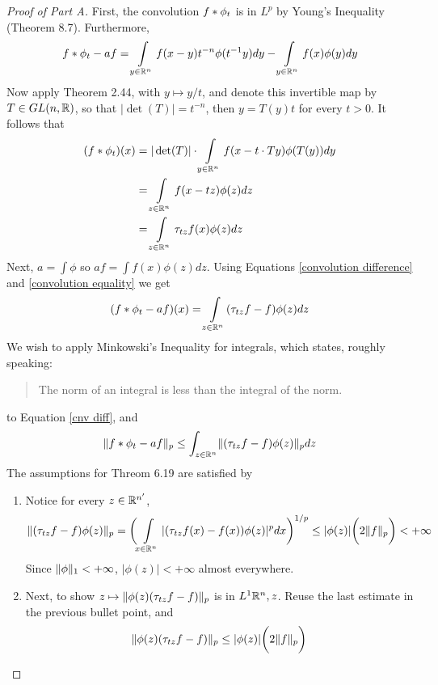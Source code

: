 \documentclass[../../main.tex]{subfiles}
\begin{document}
\begin{proof}[Proof of Part A]
    First, the convolution $f\ast \phi_t$ is in $L^p$ by Young's Inequality (Theorem 8.7). Furthermore, 
    \begin{equation}\label{convolution difference}
        f\ast \phi_t - af = \int\limits_{y\in\mathbb{R}^n} f(x-y)t^{-n}\phi(t^{-1}y)dy - \int\limits_{y\in\mathbb{R}^n} f(x)\phi(y)dy
    \end{equation}
    Now apply Theorem 2.44, with $y\mapsto y/t$, and denote this invertible map by $T\in GL(n,\mathbb{R})$, so that $|\det(T)|=t^{-n}$, then $y = T(y)t$ for every $t>0$. It follows that
    \begin{align}
    (f\ast \phi_t)(x)&=|\det(T)|\cdot\int\limits_{y\in\mathbb{R}^n}f(x-t\cdot Ty)\phi(T(y))dy\nonumber\\
    &=\int\limits_{z\in\mathbb{R}^n}f(x-tz)\phi(z)dz\nonumber\\
    &=\int\limits_{z\in\mathbb{R}^n}\tau_{tz} f(x)\phi(z)dz\label{convolution equality}
    \end{align}
    Next,  $a=\int\phi$ so $af = \int f(x)\phi(z)dz$. Using Equations \eqref{convolution difference} and \eqref{convolution equality} we get
    \begin{equation}\label{cnv diff}
        (f\ast \phi_t - af)(x) = \int\limits_{z\in\mathbb{R}^n}(\tau_{tz}f-f)\phi(z)dz
    \end{equation}
    We wish to apply Minkowski's Inequality for integrals, which states, roughly speaking:
    \begin{quote}
        The norm of an integral is less than the integral of the norm.
    \end{quote}
    to Equation \eqref{cnv diff}, and 
    \begin{equation}\label{minkowski inequality cnv}
        \lVert {f\ast\phi_t -af} \rVert_p\leq \int_{z\in\mathbb{R} ^n}\lVert {(\tau_{tz}f-f)\phi(z)} \rVert_pdz
    \end{equation}
    The assumptions for Threom 6.19 are satisfied by
    \begin{enumerate}
        \item  Notice for every $z\in\mathbb{R}^{n'}$, \[\lVert {(\tau_{tz}f-f)\phi(z)} \rVert_p = \biggl(\int\limits_{x\in\mathbb{R}^n}|(\tau_{tz}f(x)-f(x))\phi(z)|^pdx\biggr)^{1/p}\leq |\phi(z)|\biggl(2\lVert {f} \rVert_p\biggr)<+\infty\]
        Since $\lVert {\phi} \rVert_1<+\infty$, $|\phi(z)|<+\infty$ almost everywhere. 
        \item Next, to show $z\mapsto \lVert {\phi(z)(\tau_{tz}f-f)} \rVert_p$ is in $L^1{\mathbb{R}^n,z}$. Reuse the last estimate in the previous bullet point, and \[\lVert {\phi(z)(\tau_{tz}f-f)} \rVert_p\leq |\phi(z)|\biggl(2\lVert {f} \rVert_p\biggr)\]

\end{enumerate}
\end{proof}
\end{document}

